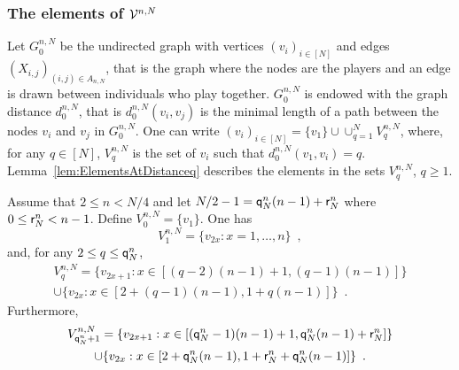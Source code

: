 \subsubsection{The elements of $\mathcal{V}^{n,N}$}
Let $G_0^{n,N}$ be the undirected graph with vertices $(v_i)_{i\in[N]}$ and edges $(X_{i,j})_{ (i,j)\in A_{n,N}}$, that is the graph where the nodes are the players and an edge is drawn between individuals who play together. $G_0^{n,N}$ is endowed with the graph distance $d^{n,N}_0$, that is $d^{n,N}_0(v_i,v_j)$ is the minimal length of a path between the nodes $v_i$ and $v_j$ in $G_0^{n,N}$. One can write $(v_i)_{i\in[N]}=\{v_1\}\cup\cup_{q=1}^{N}V^{n,N}_{q}$, where, for any $q\in[N]$, $V^{n,N}_{q}$ is the set of $v_i$ such that $d^{n,N}_0(v_1,v_i)=q$. Lemma~\ref{lem:ElementsAtDistanceq} describes the elements in the sets $V_{q}^{n,N}$, $q\ge 1$. 
\begin{lemma}\label{lem:ElementsAtDistanceq} Assume that $2\le n<N/4$ and let $N/2-1= {\mathsf{q}}^{n}_{N}(n-1)+{\mathsf{r}}^{n}_{N}$ where $0\le {\mathsf{r}}^{n}_{N}<n-1$. Define $V_{0}^{n,N}=\{v_1\}$. One has
\begin{equation}\label{def:V1}
V_{1}^{n,N}=\{v_{2x} : x=1,\ldots,n\}\enspace, 
\end{equation}
and, for any $2\le q \le {\mathsf{q}}^{n}_{N}$, 
\begin{multline}\label{def:Vq}
V_{q}^{n,N}=\{v_{2x+1} : x\in[(q-2)(n-1)+1,(q-1)(n-1)]\}\\
\cup\{v_{2x} : x\in[2+(q-1)(n-1),1+q(n-1)]\}\enspace.
\end{multline}
Furthermore,
\begin{multline}\label{def:Vq01'}
V_{{\mathsf{q}}^{n}_{N}+1}^{n,N}=\{v_{2x+1} : x\in[({\mathsf{q}}^{n}_{N}-1)(n-1)+1,{\mathsf{q}}^{n}_{N}(n-1)+{\mathsf{r}}^{n}_{N}]\}\\
\cup\{v_{2x} : x\in[2+{\mathsf{q}}^{n}_{N}(n-1),1+{\mathsf{r}}^{n}_{N}+{\mathsf{q}}^{n}_{N}(n-1)]\}\enspace.
\end{multline}
\end{lemma}
